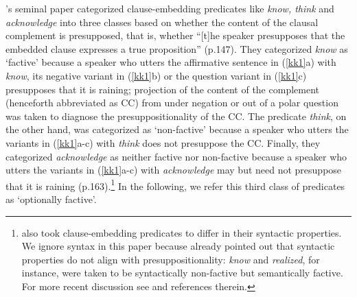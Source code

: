 \documentclass[11pt,fleqn]{article}
\newcommand{\6}{\mbox{$[\hspace*{-.6mm}[$}}
\newcommand{\9}{\mbox{$]\hspace*{-.6mm}]$}}
\newcommand{\citepos}[1]{\citeauthor{#1}'s \citeyear{#1}}
\begin{document}
\citepos{kiparsky-kiparsky70} seminal paper categorized clause-embedding predicates like {\em know, think} and {\em acknowledge} into three classes based on whether the content of the clausal complement is presupposed, that is, whether ``[t]he speaker presupposes that the embedded clause expresses a true proposition'' (p.147). They categorized {\em know} as `factive' because a speaker who utters the affirmative sentence in (\ref{kk1}a) with {\em know}, its negative variant in (\ref{kk1}b) or the question variant in (\ref{kk1}c) presupposes that it is raining; projection of the content of the complement (henceforth abbreviated as CC) from under negation or out of a polar question was taken to diagnose the presuppositionality of the CC. The predicate {\em think}, on the other hand, was categorized as `non-factive' because a speaker who utters the variants in (\ref{kk1}a-c) with {\em think} does not presuppose the CC. Finally, they categorized {\em acknowledge} as neither factive nor non-factive because a speaker who utters the variants in (\ref{kk1}a-c) with {\em acknowledge} may but need not presuppose that it is raining (p.163).\footnote{\citet{kiparsky-kiparsky70} also took clause-embedding predicates to differ in their syntactic properties. We ignore syntax in this paper because \citet[fn.3]{kiparsky-kiparsky70} already pointed out that syntactic properties do not align with presuppositionality: {\em know} and {\em realized}, for instance, were taken to be syntactically non-factive but semantically factive. For more recent discussion see \citealt{white-rawlins-nels2018} and references therein.} In the following, we refer this third class of predicates as `optionally factive'.
\end{document}
